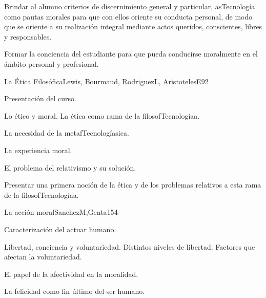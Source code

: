 \begin{syllabus}


\begin{justification}
Brindar al alumno criterios de discernimiento general y particular, asTecnología como pautas morales para que con ellos oriente su conducta personal, de modo que se oriente a su realización integral mediante actos queridos, conscientes, libres y responsables. 
\end{justification}

\begin{goals}
\item Formar la conciencia del estudiante para que pueda conducirse moralmente en el ámbito personal y profesional.
\end{goals}

\begin{outcomes}
\end{outcomes}

\begin{unit}{La Ética Filosófica}{Lewis, Bourmaud, RodriguezL, AristotelesE}{9}{2}
\begin{topics}
	\item	Presentación del curso. 
	\item	Lo ético y moral. La ética como rama de la filosofTecnologíaa.
	\item	La necesidad de la metafTecnologíasica.
	\item	La experiencia moral.
	\item	El problema del relativismo y su solución.
	
\end{topics}
\begin{learningoutcomes}
	\item Presentar una primera noción de la ética y de los problemas relativos a esta rama de la filosofTecnologíaa.
\end{learningoutcomes}
\end{unit}

\begin{unit}{La acción moral}{SanchezM,Genta}{15}{4}
\begin{topics}
	\item	Caracterización del actuar humano. 
	\item	Libertad, conciencia y voluntariedad. Distintos niveles de libertad. Factores que afectan la voluntariedad.
	\item	El papel de la afectividad en la moralidad.
	\item	La felicidad como fin último del ser humano.


\end{topics}
\end{unit}
\end{syllabus}
